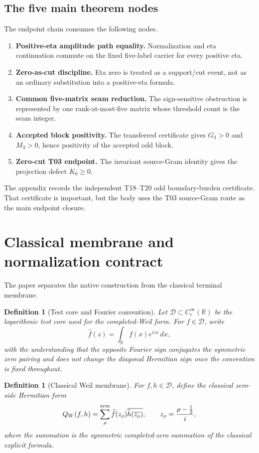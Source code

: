 \documentclass[11pt]{article}
\newtheorem{definition}[theorem]{Definition}
\newcommand{\R}{\mathbb R}
\newcommand{\DD}{\mathcal D}
\begin{document}
\subsection{The five main theorem nodes}

The endpoint chain consumes the following nodes.

\begin{enumerate}[label=(T\arabic*)]
\item \textbf{Positive-eta amplitude path equality.}  Normalization and eta continuation commute on the fixed five-label carrier for every positive eta.
\item \textbf{Zero-as-cut discipline.}  Eta zero is treated as a support/cut event, not as an ordinary substitution into a positive-eta formula.
\item \textbf{Common five-matrix seam reduction.}  The sign-sensitive obstruction is represented by one rank-at-most-five matrix whose threshold count is the seam integer.
\item \textbf{Accepted block positivity.}  The transferred certificate gives \(G_3>0\) and \(M_3>0\), hence positivity of the accepted odd block.
\item \textbf{Zero-cut T03 endpoint.}  The invariant source-Gram identity gives the projection defect \(K_0\ge0\).
\end{enumerate}

The appendix records the independent T18--T20 odd boundary-burden certificate.  That certificate is important, but the body uses the T03 source-Gram route as the main endpoint closure.

\section{Classical membrane and normalization contract}

The paper separates the native construction from the classical terminal membrane.

\begin{definition}[Test core and Fourier convention]
Let \(\DD\subset C_c^\infty(\R)\) be the logarithmic test core used for the completed-Weil form.  For \(f\in\DD\), write
\[
\widehat f(z)=\int_\R f(x)e^{izx}\,dx,
\]
with the understanding that the opposite Fourier sign conjugates the symmetric zero pairing and does not change the diagonal Hermitian sign once the convention is fixed throughout.
\end{definition}

\begin{definition}[Classical Weil membrane]
For \(f,h\in\DD\), define the classical zero-side Hermitian form
\[
Q_W(f,h)
 =
\sum_\rho^{\rm sym}
\widehat f(z_\rho)
\overline{\widehat h(\overline{z_\rho})},
\qquad
z_\rho=\frac{\rho-\tfrac12}{i},
\]
where the summation is the symmetric completed-zero summation of the classical explicit formula.
\end{definition}
\end{document}
